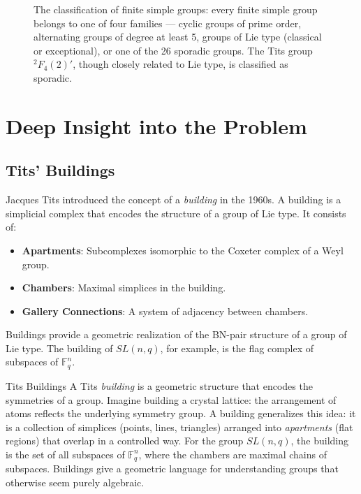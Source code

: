 \begin{figure}[htbp]
\caption{The classification of finite simple groups: every finite simple group belongs to one of four families — cyclic groups of prime order, alternating groups of degree at least 5, groups of Lie type (classical or exceptional), or one of the 26 sporadic groups. The Tits group ${}^2F_4(2)'$, though closely related to Lie type, is classified as sporadic.}
\label{fig:finite_simple_groups_tits}
\end{figure}

\section{Deep Insight into the Problem}

\subsection{Tits' Buildings}

Jacques Tits introduced the concept of a \emph{building} in the 1960s. A building is a simplicial complex that encodes the structure of a group of Lie type. It consists of:
\begin{itemize}
\item \textbf{Apartments}: Subcomplexes isomorphic to the Coxeter complex of a Weyl group.
\item \textbf{Chambers}: Maximal simplices in the building.
\item \textbf{Gallery Connections}: A system of adjacency between chambers.
\end{itemize}

Buildings provide a geometric realization of the BN-pair structure of a group of Lie type. The building of $SL(n, q)$, for example, is the flag complex of subspaces of $\mathbb{F}_q^n$.

\begin{primer}{Tits Buildings}
A Tits \emph{building} is a geometric structure that encodes the symmetries of a group. Imagine building a crystal lattice: the arrangement of atoms reflects the underlying symmetry group. A building generalizes this idea: it is a collection of simplices (points, lines, triangles) arranged into \emph{apartments} (flat regions) that overlap in a controlled way. For the group $SL(n,q)$, the building is the set of all subspaces of $\mathbb{F}_q^n$, where the chambers are maximal chains of subspaces. Buildings give a geometric language for understanding groups that otherwise seem purely algebraic.
\end{primer}

